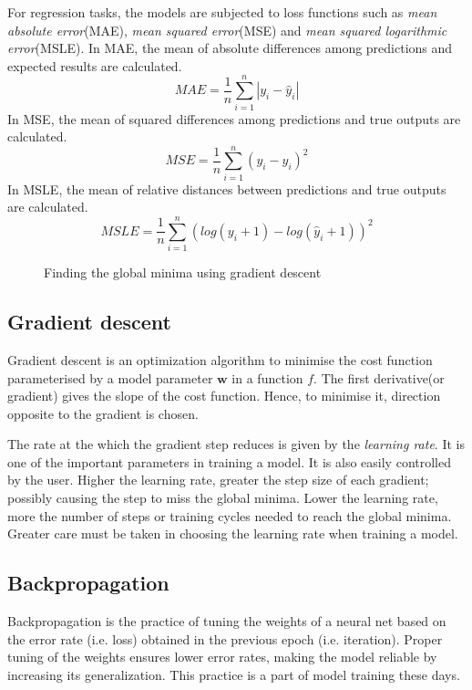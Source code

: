 For regression tasks, the models are subjected to loss functions such as \textit{mean
absolute error}(MAE), \textit{mean squared error}(MSE) and \textit{mean squared
logarithmic error}(MSLE). In MAE, the mean of absolute differences among predictions and
expected results are calculated.
\begin{equation}
    MAE = \frac{1}{n}\sum_{i=1}^n\left |y_i -\hat y_i \right|
   \label{eq:MAE}
\end{equation}
In MSE, the mean of squared differences among predictions and true outputs are
calculated.
\begin{equation}
    MSE = \frac{1}{n}\sum_{i=1}^n (y_i - \hat y_i)^2
    \label{eq:MSE}
\end{equation}
In MSLE, the mean of relative distances between predictions and true outputs are
calculated.
\begin{equation}
    MSLE = \frac{1}{n}\sum_{i=1}^n(log(y_i+1)-log(\hat y_i+1))^2
    \label{eq:MSLE}
\end{equation}

\begin{figure}
	\centering
    \def\svgwidth{0.6\textwidth}
        
    \caption{Finding the global minima using gradient descent}
    \label{fig:gradientdescent}
\end{figure}


\subsection{Gradient descent}
\label{subsec:gradientdescent}
Gradient descent is an optimization algorithm to minimise the cost function parameterised by a
model parameter $\mathbf{w}$ in a function $f$. The first derivative(or gradient) gives the slope of the
cost function. Hence, to minimise it, direction opposite to the gradient is chosen.

The rate at the which the gradient step reduces is given by the \textit{learning rate}. It
is one of the important parameters in training a model. It is also easily controlled by
the user. Higher the learning rate, greater the step size of each gradient; possibly causing the
step to miss the global minima. Lower the learning rate, more the number of steps or training cycles
needed to reach the global minima. Greater care must be taken in choosing the learning
rate when training a model.

\subsection{Backpropagation}
\label{subsec:backpropagation}
Backpropagation is the practice of tuning the weights of a neural net based on the error rate (i.e. loss) obtained in the previous epoch (i.e. iteration).
Proper tuning of the weights ensures lower error rates, making the model reliable by increasing its generalization.
This practice is a part of model training these days.

